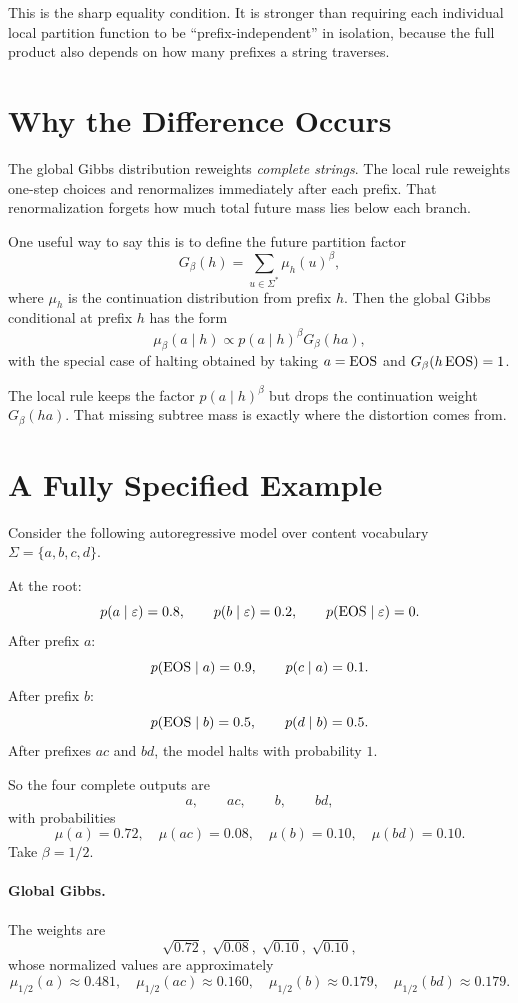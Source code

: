 This is the sharp equality condition. It is stronger than requiring each individual local partition function to be ``prefix-independent'' in isolation, because the full product also depends on how many prefixes a string traverses.

\section{Why the Difference Occurs}

The global Gibbs distribution reweights \emph{complete strings}. The local rule reweights one-step choices and renormalizes immediately after each prefix. That renormalization forgets how much total future mass lies below each branch.

One useful way to say this is to define the future partition factor
\[
  G_\beta(h) = \sum_{u \in \Sigma^*} \mu_h(u)^\beta,
\]
where $\mu_h$ is the continuation distribution from prefix $h$. Then the global Gibbs conditional at prefix $h$ has the form
\[
  \mu_\beta(a \mid h) \propto p(a \mid h)^\beta G_\beta(ha),
\]
with the special case of halting obtained by taking $a=\operatorname{EOS}$ and $G_\beta(h\operatorname{EOS})=1$.

The local rule keeps the factor $p(a \mid h)^\beta$ but drops the continuation weight $G_\beta(ha)$. That missing subtree mass is exactly where the distortion comes from.

\section{A Fully Specified Example}

Consider the following autoregressive model over content vocabulary $\Sigma=\{a,b,c,d\}$.

At the root:
\[
  p(a \mid \varepsilon)=0.8,
  \qquad
  p(b \mid \varepsilon)=0.2,
  \qquad
  p(\operatorname{EOS} \mid \varepsilon)=0.
\]
After prefix $a$:
\[
  p(\operatorname{EOS} \mid a)=0.9,
  \qquad
  p(c \mid a)=0.1.
\]
After prefix $b$:
\[
  p(\operatorname{EOS} \mid b)=0.5,
  \qquad
  p(d \mid b)=0.5.
\]
After prefixes $ac$ and $bd$, the model halts with probability $1$.

So the four complete outputs are
\[
  a,
  \qquad
  ac,
  \qquad
  b,
  \qquad
  bd,
\]
with probabilities
\[
  \mu(a)=0.72,
  \quad
  \mu(ac)=0.08,
  \quad
  \mu(b)=0.10,
  \quad
  \mu(bd)=0.10.
\]
Take $\beta=1/2$.

\paragraph{Global Gibbs.}
The weights are
\[
  \sqrt{0.72},\; \sqrt{0.08},\; \sqrt{0.10},\; \sqrt{0.10},
\]
whose normalized values are approximately
\[
  \mu_{1/2}(a)\approx 0.481,
  \quad
  \mu_{1/2}(ac)\approx 0.160,
  \quad
  \mu_{1/2}(b)\approx 0.179,
  \quad
  \mu_{1/2}(bd)\approx 0.179.
\]

